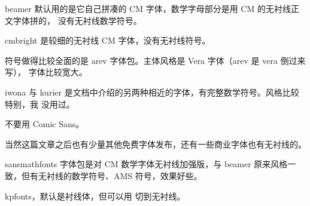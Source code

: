 beamer 默认用的是它自己拼凑的 CM 字体，数学字母部分是用 CM 的无衬线正文字体拼的，
没有无衬线数学符号。

cmbright 是较细的无衬线 CM 字体，没有无衬线符号。

符号做得比较全面的是 arev 字体包。主体风格是 Vera 字体（arev 是 vera 倒过来写），
字体比较宽大。

iwona 与 kurier 是文档中介绍的另两种相近的字体，有完整数学符号。风格比较特别，我
没用过。

不要用 Comic Sans。

当然这篇文章之后也有少量其他免费字体发布，还有一些商业字体也有无衬线的。

    sansmathfonts 字体包是对 CM 数学字体无衬线加强版，与 beamer 原来风格一致，但有无衬线的数学符号、AMS 符号，效果好些。

    kpfonts，默认是衬线体，但可以用  切到无衬线。